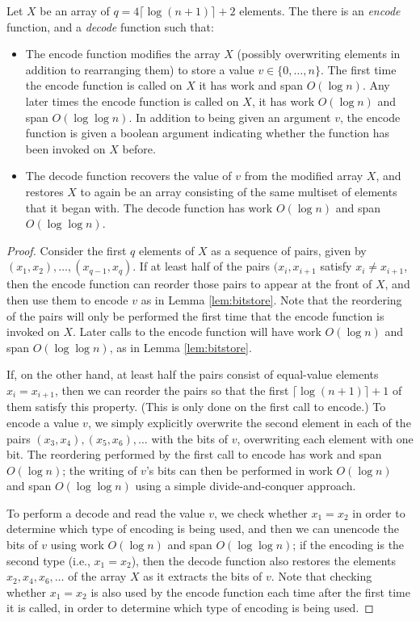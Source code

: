 \documentclass[a4paper,UKenglish,cleveref, autoref, thm-restate]{lipics-v2019}
\begin{document}
\begin{lemma}
Let $X$ be an array of $q = 4 \lceil \log (n + 1) \rceil + 2$
elements. The there is an \emph{encode} function, and a \emph{decode}
function such that:
\begin{itemize}
\item The encode function modifies the array $X$ (possibly overwriting
  elements in addition to rearranging them) to store a value $v \in
  \{0, \ldots, n\}$. The first time the encode function is called on
  $X$ it has work and span $O(\log n)$. Any later times the encode
  function is called on $X$, it has work $O(\log n)$ and span $O(\log
  \log n)$. In addition to being given an argument $v$, the encode
  function is given a boolean argument indicating whether the function
  has been invoked on $X$ before.
\item The decode function recovers the value of $v$ from the modified
  array $X$, and restores $X$ to again be an array consisting of the
  same multiset of elements that it began with. The decode function
  has work $O(\log n)$ and span $O(\log \log n)$.
\end{itemize}
  \label{lem:bitstore2}
\end{lemma}
\begin{proof}
Consider the first $q$ elements of $X$ as a sequence of pairs, given by
$(x_1, x_2), \ldots, (x_{q - 1}, x_q)$. If at least half of the pairs
$(x_i, x_{i + 1}$ satisfy $x_i \neq x_{i + 1}$, then the encode
function can reorder those pairs to appear at the front of $X$, and
then use them to encode $v$ as in Lemma \ref{lem:bitstore}. Note that
the reordering of the pairs will only be performed the first time that
the encode function is invoked on $X$. Later calls to the encode
function will have work $O(\log n)$ and span $O(\log \log n)$, as in
Lemma \ref{lem:bitstore}.

If, on the other hand, at least half the pairs consist of equal-value
elements $x_i = x_{i + 1}$, then we can reorder the pairs so that the
first $\lceil \log (n + 1) \rceil + 1$ of them satisfy this
property. (This is only done on the first call to encode.) To encode a
value $v$, we simply explicitly overwrite the second element in each
of the pairs $(x_3, x_4), (x_5, x_6), \ldots$ with the bits of $v$,
overwriting each element with one bit. The reordering performed by the
first call to encode has work and span $O(\log n)$; the writing of
$v$'s bits can then be performed in work $O(\log n)$ and span $O(\log
\log n)$ using a simple divide-and-conquer approach.

To perform a decode and read the value $v$, we check whether $x_1 =
x_2$ in order to determine which type of encoding is being used, and
then we can unencode the bits of $v$ using work $O(\log n)$ and span
$O(\log \log n)$; if the encoding is the second type (i.e., $x_1 =
x_2$), then the decode function also restores the elements $x_2, x_4,
x_6, \ldots$ of the array $X$ as it extracts the bits of $v$. Note
that checking whether $x_1 = x_2$ is also used by the encode function
each time after the first time it is called, in order to determine which
type of encoding is being used.
\end{proof}
\end{document}
